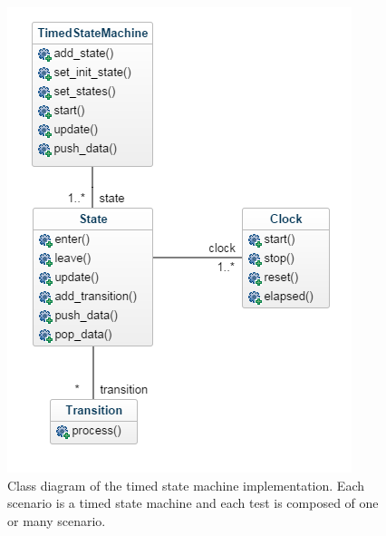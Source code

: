 \documentclass[12pt]{article}
\theoremstyle{definition}
\theoremstyle{definition}
\begin{document}
\begin{figure}
    \centering
    \includegraphics[scale=0.8]{class_diagram.png}
    \caption{Class diagram of the timed state machine implementation. Each scenario is a timed state machine and each test is composed of one or many scenario.}
    \label{class_diagram}
\end{figure}
\end{document}

